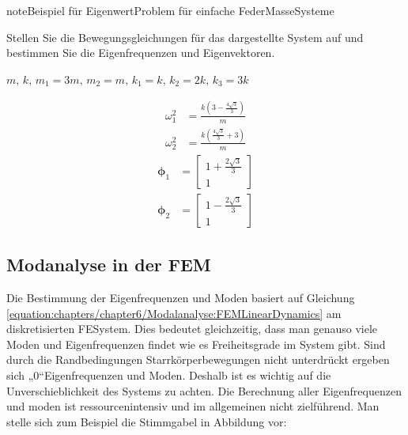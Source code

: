 \documentclass[letterpaper,10pt,german]{jupyterBook}
\begin{document}
\begin{sphinxadmonition}{note}{Beispiel für Eigenwert\sphinxhyphen{}Problem für einfache Feder\sphinxhyphen{}Masse\sphinxhyphen{}Systeme}

\sphinxAtStartPar
Stellen Sie die Bewegungsgleichungen für das dargestellte System auf und bestimmen Sie die Eigenfrequenzen und Eigenvektoren.

\sphinxAtStartPar
{} \(m,\,k,\,m_1=3m,\,m_2=m,\,k_1=k,\,k_2=2k,\,k_3=3k\)

\sphinxAtStartPar
{}

\sphinxAtStartPar
{}
\begin{align*}
\omega_1^2 &= \frac{k \left(3 - \frac{4 \sqrt{3}}{3}\right)}{m}\\
\omega_2^2 &=\frac{k \left(\frac{4 \sqrt{3}}{3} + 3\right)}{m}
\end{align*}\begin{align*}
\bm{\phi}_1 &= \left[\begin{matrix}1 + \frac{2 \sqrt{3}}{3}\\1\end{matrix}\right]
\\
\bm{\phi}_2 &=  \left[\begin{matrix}1 - \frac{2 \sqrt{3}}{3}\\1\end{matrix}\right]
\end{align*}\end{sphinxadmonition}


\subsection{Modanalyse in der FEM}
\label{\detokenize{chapters/chapter6/Modalanalyse:modanalyse-in-der-fem}}
\sphinxAtStartPar
Die Bestimmung der Eigenfrequenzen und Moden basiert auf Gleichung \eqref{equation:chapters/chapter6/Modalanalyse:FEMLinearDynamics} am diskretisierten FE\sphinxhyphen{}System. Dies bedeutet gleichzeitig, dass man genauso viele Moden und Eigenfrequenzen findet wie es Freiheitsgrade im System gibt. Sind durch die Randbedingungen Starrkörperbewegungen nicht unterdrückt ergeben sich „0“\sphinxhyphen{}Eigenfrequenzen und Moden. Deshalb ist es wichtig auf die Unverschieblichkeit des Systems zu achten. Die Berechnung aller Eigenfrequenzen und \sphinxhyphen{}moden ist ressourcenintensiv und im allgemeinen nicht zielführend. Man stelle sich zum Beispiel die Stimmgabel in Abbildung vor:
\end{document}
